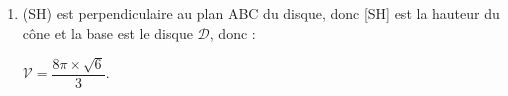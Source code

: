 \begin{enumerate}
Déterminer la valeur exacte de l'aire du disque $\mathcal{D}$.
On a HB$^2 = (- 2)^2 + (- 2)^2 + 0^2 = 4 + 4 = 4 \times 2$, d'où HB $= 2\sqrt 2$.

L'aire du disque $\mathcal{D}$ est égale à $\mathcal{A}  = \pi \times \text{HB}^2 = 8\pi$.
\item %
(SH) est perpendiculaire au plan ABC du disque, donc [SH] est la hauteur du cône et la base est le disque $\mathcal{D}$, donc :

$\mathcal{V} = \dfrac{8\pi \times \sqrt{6}}{3}$.
\end{enumerate}

\medskip


